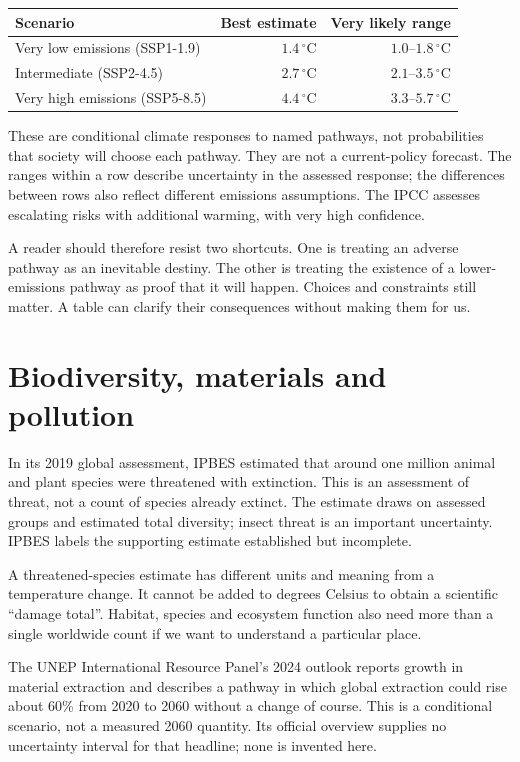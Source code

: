 \begin{center}\small
\begin{tabular}{@{}p{157pt}rr@{}}
\toprule
Scenario & Best estimate & Very likely range\\
\midrule
Very low emissions (SSP1-1.9) & $1.4\,^{\circ}\mathrm{C}$ & $1.0$--$1.8\,^{\circ}\mathrm{C}$\\
Intermediate (SSP2-4.5) & $2.7\,^{\circ}\mathrm{C}$ & $2.1$--$3.5\,^{\circ}\mathrm{C}$\\
Very high emissions (SSP5-8.5) & $4.4\,^{\circ}\mathrm{C}$ & $3.3$--$5.7\,^{\circ}\mathrm{C}$\\
\bottomrule
\end{tabular}
\end{center}

These are conditional climate responses to named pathways, not probabilities that society will choose each pathway. They are not a current-policy forecast. The ranges within a row describe uncertainty in the assessed response; the differences between rows also reflect different emissions assumptions. The IPCC assesses escalating risks with additional warming, with very high confidence.\cite{ipcc}

A reader should therefore resist two shortcuts. One is treating an adverse pathway as an inevitable destiny. The other is treating the existence of a lower-emissions pathway as proof that it will happen. Choices and constraints still matter. A table can clarify their consequences without making them for us.

\section{Biodiversity, materials and pollution}
In its 2019 global assessment, IPBES estimated that around one million animal and plant species were threatened with extinction. This is an assessment of threat, not a count of species already extinct. The estimate draws on assessed groups and estimated total diversity; insect threat is an important uncertainty. IPBES labels the supporting estimate established but incomplete.\cite{ipbes}

A threatened-species estimate has different units and meaning from a temperature change. It cannot be added to degrees Celsius to obtain a scientific ``damage total''. Habitat, species and ecosystem function also need more than a single worldwide count if we want to understand a particular place.

The UNEP International Resource Panel's 2024 outlook reports growth in material extraction and describes a pathway in which global extraction could rise about 60\% from 2020 to 2060 without a change of course. This is a conditional scenario, not a measured 2060 quantity. Its official overview supplies no uncertainty interval for that headline; none is invented here.\cite{resources}

